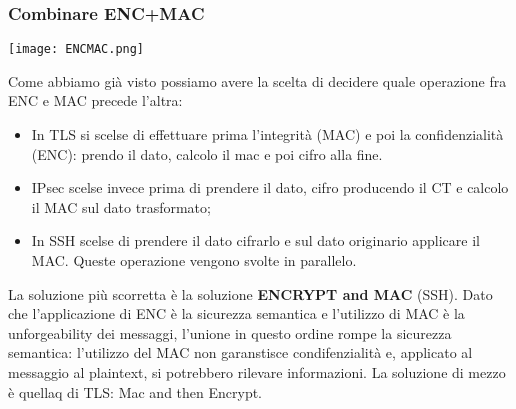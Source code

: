 \documentclass{article}
\theoremstyle{remark}
\begin{document}
\subsubsection{Combinare ENC+MAC}
\begin{center}
	\texttt{[image: ENCMAC.png]}
\end{center}
Come abbiamo già visto possiamo avere la scelta di decidere quale operazione fra ENC e MAC precede l'altra:\begin{itemize}
	\item In TLS si scelse di effettuare prima l'integrità (MAC) e poi la confidenzialità (ENC): prendo il dato, calcolo il mac e poi cifro alla fine.
	\item IPsec scelse invece prima di prendere il dato, cifro producendo il CT e calcolo il MAC sul dato trasformato;
	\item In SSH scelse di prendere il dato cifrarlo e sul dato originario applicare il MAC. Queste operazione vengono svolte in parallelo.
\end{itemize}
La soluzione più scorretta è la soluzione \textbf{ENCRYPT and MAC} (SSH). Dato che l'applicazione di ENC è la sicurezza semantica e l'utilizzo di MAC è la unforgeability dei messaggi, l'unione in questo ordine rompe la sicurezza semantica: l'utilizzo del MAC non garanstisce condifenzialità e, applicato al messaggio al plaintext, si potrebbero rilevare informazioni.
La soluzione di mezzo è quellaq di TLS: Mac and then Encrypt.
\end{document}
